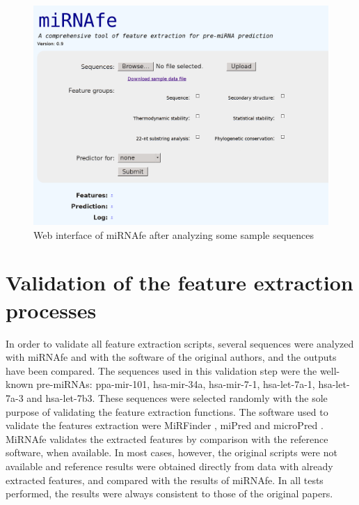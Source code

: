 \documentclass{article}
\begin{document}
\begin{figure}[tb]
 \centering
 \includegraphics[width=\textwidth]{screenshot.png}
 \caption{Web interface of miRNAfe after analyzing some sample sequences}
 \label{fig:screenshot}
\end{figure}

\section{Validation of the feature extraction processes}
In order to validate all feature extraction scripts, several sequences were analyzed with miRNAfe and with the software of the original authors, and the
outputs have been compared. The sequences used in this validation step were the well-known pre-miRNAs: ppa-mir-101, hsa-mir-34a, hsa-mir-7-1, hsa-let-7a-1,
hsa-let-7a-3 and hsa-let-7b3. These sequences were selected randomly with the sole purpose of validating the feature extraction functions. The software used to
validate the features extraction were MiRFinder \citep{Huang07}, miPred \citep{Jiang07} and microPred \citep{Rukshan09}. MiRNAfe validates the extracted
features by comparison with the reference software, when available. In most cases, however, the original scripts were not available and reference results were
obtained directly from data with already extracted features, and compared with the results of miRNAfe. In all tests performed, the results were always
consistent to those of the original papers.
\end{document}
